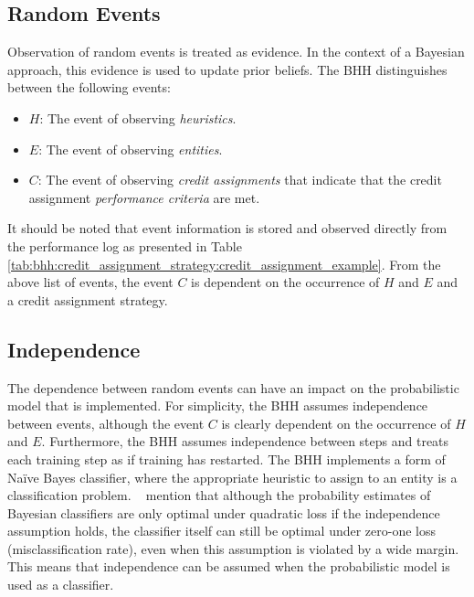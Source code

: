 \subsection{Random Events}
\label{sec:bhh:selection_mechanism:random_events}

Observation of random events is treated as evidence. In the context of a Bayesian approach, this evidence is used to update prior beliefs. The \acs{BHH} distinguishes between the following events:

\begin{itemize}
      \item \textbf{$H$}: The event of observing \textit{heuristics}.
      \item \textbf{$E$}: The event of observing \textit{entities}.
      \item \textbf{$C$}: The event of observing \textit{credit assignments} that indicate that the credit assignment \textit{performance criteria} are met.
\end{itemize}

It should be noted that event information is stored and observed directly from the performance log as presented in Table \ref{tab:bhh:credit_assignment_strategy:credit_assignment_example}. From the above list of events, the event $C$ is dependent on the occurrence of $H$ and $E$ and a credit assignment strategy.

\subsection{Independence}\label{sec:bhh:selection_mechanism:independence}

The dependence between random events can have an impact on the probabilistic model that is implemented. For simplicity, the \acs{BHH} assumes independence between events, although the event $C$ is clearly dependent on the occurrence of $H$ and $E$. Furthermore, the \acs{BHH} assumes independence between steps  and treats each training step as if training has restarted. The \acs{BHH} implements a form of Naïve Bayes classifier, where the appropriate heuristic to assign to an entity is a classification problem. \citeauthor{ref:domingos:1997}~\cite{ref:domingos:1997} mention that although the probability estimates of Bayesian classifiers are only optimal under quadratic loss if the independence assumption holds, the classifier itself can still be optimal under zero-one loss (misclassification rate), even when this assumption is violated by a wide margin. This means that independence can be assumed when the probabilistic model is used as a classifier.

